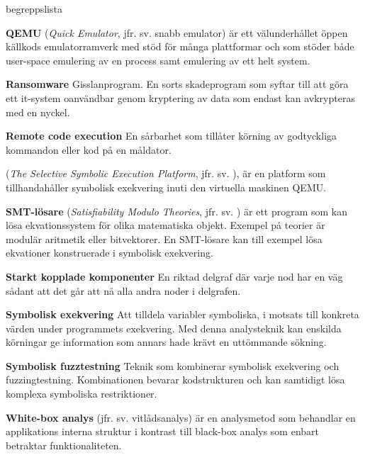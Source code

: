 \begin{labeling}{begreppslista}
    \item [\textbf{QEMU}] (\emph{Quick Emulator}, jfr. sv. snabb emulator) är ett
    välunderhållet öppen källkods emulatorramverk med stöd för många plattformar
    och som stöder både user-space emulering av en process samt emulering av ett
    helt system.

    \item [\textbf{Ransomware}] Gisslanprogram. En sorts skadeprogram som syftar
    till att göra ett it-system oanvändbar genom kryptering av data som
    endast kan avkrypteras med en nyckel.

    \item [\textbf{Remote code execution}] En sårbarhet som tillåter körning av
    godtyckliga kommandon eller kod på en måldator.

    \item [\textbf{\stoe}] (\emph{The Selective Symbolic Execution Platform}, jfr. sv. ), är
    en platform som tillhandahåller symbolisk exekvering inuti den virtuella
    maskinen QEMU.

    \item [\textbf{SMT-lösare}] (\emph{Satisfiability Modulo Theories}, jfr. sv. ) är ett
    program som kan lösa ekvationssystem för olika matematiska objekt. Exempel
    på teorier är modulär aritmetik eller bitvektorer. En SMT-lösare kan till
    exempel lösa ekvationer konstruerade i symbolisk exekvering.

    \item [\textbf{Starkt kopplade komponenter}] En riktad delgraf där
    varje nod har en väg sådant att det går att nå alla andra noder i delgrafen.

    \item [\textbf{Symbolisk exekvering}] Att tilldela variabler symboliska, i
    motsats till konkreta värden under programmets exekvering. Med denna
    analysteknik kan enskilda körningar ge information som annars hade krävt
    en uttömmande sökning.

    \item [\textbf{Symbolisk fuzztestning}] Teknik som kombinerar symbolisk exekvering
    och fuzzingtestning. Kombinationen  bevarar kodstrukturen och kan samtidigt
    lösa komplexa symboliska restriktioner.

    \item [\textbf{White-box analys}] (jfr. sv. vitlådsanalys) är en analysmetod
    som behandlar en applikations interna struktur i kontrast till black-box
    analys som enbart betraktar funktionaliteten.

\end{labeling}
